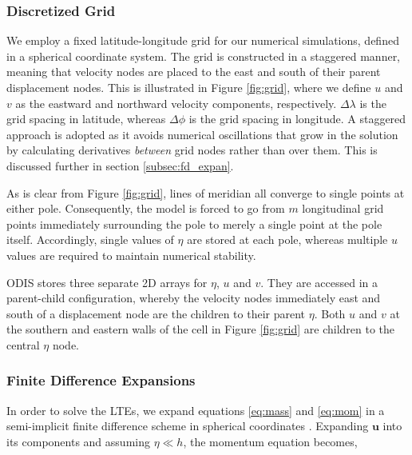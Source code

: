 \subsubsection{Discretized Grid \label{subsec:grid}}

We employ a fixed latitude-longitude grid for our numerical simulations, defined in a spherical coordinate system. The grid is constructed in a staggered manner, meaning that velocity nodes are placed to the east and south of their parent displacement nodes. This is illustrated in Figure \ref{fig:grid}, where we define $u$ and $v$ as the eastward and northward velocity components, respectively. $\Delta \lambda$ is the grid spacing in latitude, whereas $\Delta \phi$ is the grid spacing in longitude. A staggered approach is adopted as it avoids numerical oscillations that grow in the solution by calculating derivatives \textit{between} grid nodes rather than over them. This is discussed further in section \ref{subsec:fd_expan}.

As is clear from Figure \ref{fig:grid}, lines of meridian all converge to single points at either pole. Consequently, the model is forced to go from $m$ longitudinal grid points immediately surrounding the pole to merely a single point at the pole itself. Accordingly, single values of $\eta$ are stored at each pole, whereas multiple $u$ values are required to maintain numerical stability. 

ODIS stores three separate 2D arrays for $\eta$, $u$ and $v$. They are accessed in a parent-child configuration, whereby the velocity nodes immediately east and south of a displacement node are the children to their parent $\eta$. Both $u$ and $v$ at the southern and eastern walls of the cell in Figure \ref{fig:grid} are children to the central $\eta$ node. %

\subsubsection{Finite Difference Expansions \label{subsec:fd_expan}}

In order to solve the LTEs, we expand equations \ref{eq:mass} and \ref{eq:mom} in a semi-implicit finite difference scheme in spherical coordinates \citep{sears1995tidal}. Expanding $\bm{u}$ into its components and assuming $\eta \ll h$, the momentum equation becomes,

